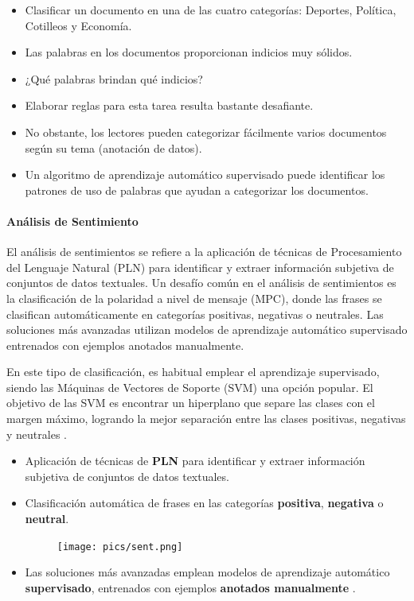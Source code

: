 \documentclass{book}
\begin{document}
\begin{itemize}
\item Clasificar un documento en una de las cuatro categorías: Deportes, Política, Cotilleos y Economía.
\item Las palabras en los documentos proporcionan indicios muy sólidos.
\item ¿Qué palabras brindan qué indicios?
\item Elaborar reglas para esta tarea resulta bastante desafiante.
\item No obstante, los lectores pueden categorizar fácilmente varios documentos según su tema (anotación de datos).
\item Un algoritmo de aprendizaje automático supervisado puede identificar los patrones de uso de palabras que ayudan a categorizar los documentos.
\end{itemize}
\paragraph{Análisis de Sentimiento}

El análisis de sentimientos se refiere a la aplicación de técnicas de Procesamiento del Lenguaje Natural (PLN) para identificar y extraer información subjetiva de conjuntos de datos textuales. Un desafío común en el análisis de sentimientos es la clasificación de la polaridad a nivel de mensaje (MPC), donde las frases se clasifican automáticamente en categorías positivas, negativas o neutrales. Las soluciones más avanzadas utilizan modelos de aprendizaje automático supervisado entrenados con ejemplos anotados manualmente.

En este tipo de clasificación, es habitual emplear el aprendizaje supervisado, siendo las Máquinas de Vectores de Soporte (SVM) una opción popular. El objetivo de las SVM es encontrar un hiperplano que separe las clases con el margen máximo, logrando la mejor separación entre las clases positivas, negativas y neutrales \cite{jacobbook}.

\begin{itemize}
  \item Aplicación de técnicas de \textbf{PLN} para identificar y extraer información subjetiva de conjuntos de datos textuales.
  \item Clasificación automática de frases en las categorías \textcolor[rgb]{0.00,0.00,1.00}{\textbf{positiva}}, \textcolor[rgb]{1.00,0.00,0.00}{\textbf{negativa}} o \textcolor[rgb]{0.00,1.00,0.00}{\textbf{neutral}}.

     \begin{figure}[h]
        	\texttt{[image: pics/sent.png]}
        \end{figure}

  \item Las soluciones más avanzadas emplean modelos de aprendizaje automático \textbf{supervisado}, entrenados con ejemplos \textbf{anotados manualmente} \cite{Mohammad2013}.
\end{itemize}
\end{document}
